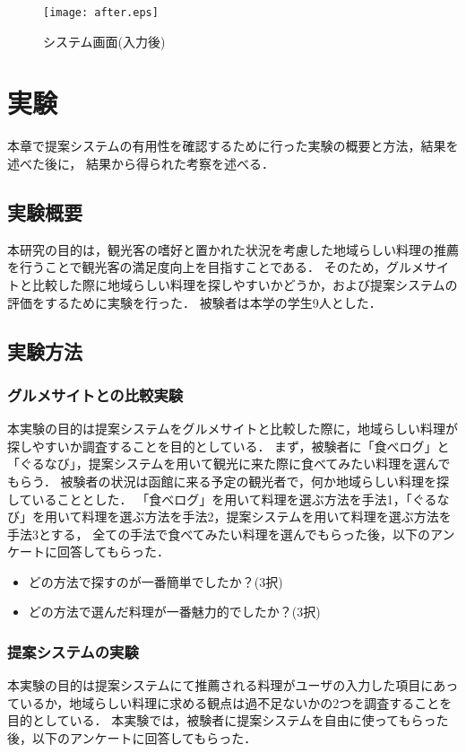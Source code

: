 \documentclass{funthesis}
\begin{document}
\newpage

\begin{figure}[tbp]
  \begin{center}
    \texttt{[image: after.eps]}
    \caption{システム画面(入力後)}
  \end{center}
\end{figure}

\chapter{実験}
本章で提案システムの有用性を確認するために行った実験の概要と方法，結果を述べた後に，
結果から得られた考察を述べる．

\section{実験概要}
本研究の目的は，観光客の嗜好と置かれた状況を考慮した地域らしい料理の推薦を行うことで観光客の満足度向上を目指すことである．
そのため，グルメサイトと比較した際に地域らしい料理を探しやすいかどうか，および提案システムの評価をするために実験を行った．
被験者は本学の学生9人とした．

\section{実験方法}
\subsection{グルメサイトとの比較実験}
本実験の目的は提案システムをグルメサイトと比較した際に，地域らしい料理が探しやすいか調査することを目的としている．
まず，被験者に「食べログ」と「ぐるなび」，提案システムを用いて観光に来た際に食べてみたい料理を選んでもらう．
被験者の状況は函館に来る予定の観光者で，何か地域らしい料理を探していることとした．
「食べログ」を用いて料理を選ぶ方法を手法1，「ぐるなび」を用いて料理を選ぶ方法を手法2，提案システムを用いて料理を選ぶ方法を手法3とする，
全ての手法で食べてみたい料理を選んでもらった後，以下のアンケートに回答してもらった．

\begin{itemize}
 \item どの方法で探すのが一番簡単でしたか？(3択)
 \item どの方法で選んだ料理が一番魅力的でしたか？(3択)
\end{itemize}

\subsection{提案システムの実験}
本実験の目的は提案システムにて推薦される料理がユーザの入力した項目にあっているか，地域らしい料理に求める観点は過不足ないかの2つを調査することを目的としている．
本実験では，被験者に提案システムを自由に使ってもらった後，以下のアンケートに回答してもらった．
\end{document}
